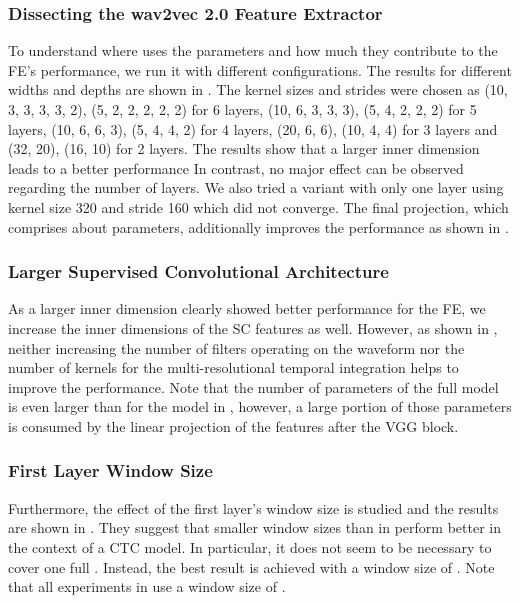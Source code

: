 \documentclass{INTERSPEECH2023}
\begin{document}
\subsubsection{Dissecting the wav2vec 2.0 Feature Extractor}
\label{sec:w2v_components}
To understand where \wvtwo uses the parameters and how much they contribute to the \gls{FE}'s performance, we run it with different configurations.
The results for different widths and depths are shown in .
The kernel sizes and strides were chosen as (10, 3, 3, 3, 3, 2), (5, 2, 2, 2, 2, 2) for 6 layers, (10, 6, 3, 3, 3), (5, 4, 2, 2, 2) for 5 layers, (10, 6, 6, 3), (5, 4, 4, 2) for 4 layers, (20, 6, 6), (10, 4, 4) for 3 layers and (32, 20), (16, 10) for 2 layers.
The results show that a larger inner dimension leads to a better performance
In contrast, no major effect can be observed regarding the number of layers.
We also tried a variant with only one layer using kernel size 320 and stride 160 which did not converge.
The final projection, which comprises about  parameters, additionally improves the performance as shown in .



\subsubsection{Larger Supervised Convolutional Architecture}
\label{sec:scf_size}
As a larger inner dimension clearly showed better performance for the \wvtwo \gls{FE}, we increase the inner dimensions of the \gls{SC} features as well.
However, as shown in , neither increasing the number of filters operating on the waveform nor the number of kernels for the multi-resolutional temporal integration helps to improve the performance.
Note that the number of parameters of the full model is even larger than for the \wvtwo model in , however, a large portion of those parameters is consumed by the linear projection of the features after the \gls{VGG} block.


\subsubsection{First Layer Window Size}
\label{sec:scf_first_window}
Furthermore, the effect of the first layer's window size is studied and the results are shown in .
They suggest that smaller window sizes than in \cite{tuske2018:waveform} perform better in the context of a \conformer \gls{CTC} model.
In particular, it does not seem to be necessary to cover one full .
Instead, the best result is achieved with a window size of .
Note that all experiments in  use a window size of .

\end{document}
